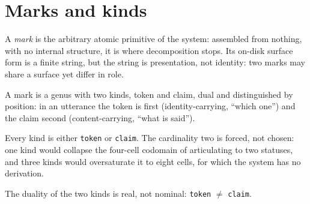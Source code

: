 \section{Marks and kinds}

\begin{definition}[Mark]
  \label{def:mark}
  \leanok
  A \emph{mark} is the arbitrary atomic primitive of the system: assembled from
  nothing, with no internal structure, it is where decomposition stops. Its
  on-disk surface form is a finite string, but the string is presentation, not
  identity: two marks may share a surface yet differ in role.
\end{definition}

\begin{proposition}[Kind]
  \label{thm:kind}
  \leanok
  A mark is a genus with two kinds, token and claim, dual and distinguished by
  position: in an utterance the token is first (identity-carrying, ``which
  one'') and the claim second (content-carrying, ``what is said'').
\end{proposition}

\begin{lemma}
  \label{lem:two-kinds}
  \leanok
  Every kind is either \texttt{token} or \texttt{claim}. The cardinality two is
  forced, not chosen: one kind would collapse the four-cell codomain of
  articulating to two statuses, and three kinds would oversaturate it to eight
  cells, for which the system has no derivation.
\end{lemma}

\begin{lemma}
  \label{lem:token-ne-claim}
  \leanok
  The duality of the two kinds is real, not nominal: \texttt{token} $\neq$
  \texttt{claim}.
\end{lemma}
